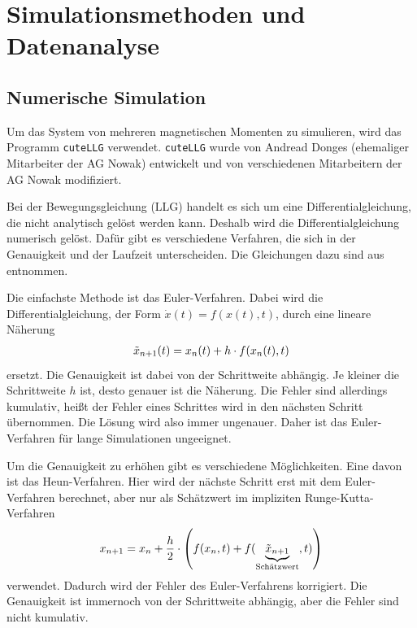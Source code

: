 \documentclass[main.tex]{subfiles}
\begin{document}
\newpage
\section{Simulationsmethoden und Datenanalyse}

\subsection{Numerische Simulation}
Um das System von mehreren magnetischen Momenten zu simulieren, wird das Programm \texttt{cuteLLG}\cite{cuteLLG} verwendet. \texttt{cuteLLG} wurde von Andread Donges (ehemaliger Mitarbeiter der AG Nowak) entwickelt und von verschiedenen Mitarbeitern der AG Nowak modifiziert.



Bei der Bewegungsgleichung (LLG) handelt es sich um eine Differentialgleichung, die nicht analytisch gelöst werden kann.
Deshalb wird die Differentialgleichung numerisch gelöst. Dafür gibt es verschiedene Verfahren, die sich in der Genauigkeit und der Laufzeit unterscheiden. 
Die Gleichungen dazu sind aus \cite{Computerphysik} entnommen.

Die einfachste Methode ist das Euler-Verfahren. Dabei wird die
Differentialgleichung, der Form \(\Dot{x}(t) = f(x(t),t)\), durch eine lineare Näherung 
\begin{align}
    \Tilde{x}_{n+1}(t) = x_n(t) + h \cdot f(x_n(t),t)
\end{align}
ersetzt. Die Genauigkeit ist dabei von der Schrittweite abhängig. Je kleiner die Schrittweite \(h\) ist, desto genauer ist die Näherung. 
Die Fehler sind allerdings kumulativ, heißt der Fehler eines Schrittes wird in den nächsten Schritt übernommen. Die Lösung wird also immer ungenauer.
Daher ist das Euler-Verfahren für lange Simulationen ungeeignet.


Um die Genauigkeit zu erhöhen gibt es verschiedene Möglichkeiten. Eine davon ist das Heun-Verfahren. Hier wird der nächste Schritt erst mit dem Euler-Verfahren berechnet, aber nur als Schätzwert im impliziten Runge-Kutta-Verfahren 
\begin{align}
    x_{n+1} = x_n + \frac{h}{2} \cdot \qty(f(x_n,t) + f(\underbrace{\Tilde{x}_{n+1}}_\text{Schätzwert},t))
\end{align}
verwendet. Dadurch wird der Fehler des Euler-Verfahrens korrigiert. Die Genauigkeit ist immernoch von der Schrittweite abhängig, aber die Fehler sind nicht kumulativ.
\end{document}
